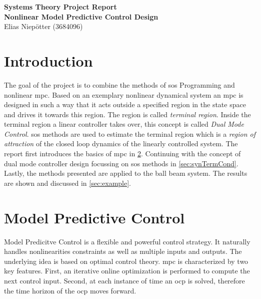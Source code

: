 \documentclass[10pt,a4paper]{article}
\begin{document}
\pagestyle{fancy}

\setlength{\parindent}{0pt}


\begin{center}
	\LARGE{\textbf{Systems Theory Project Report}}\\[0.25em]
	\normalsize\textbf{Nonlinear Model Predictive Control Design}\\[0.25em]
	\normalsize{Elias Niepötter (3684096)}
\end{center}

\vskip 0.5cm

\begin{abstract}
\end{abstract}

\vskip 0.5cm


\section{Introduction}
The goal of the project is to combine the methods of \gls{sos} Programming and nonlinear \gls{mpc}.
Based on an exemplary nonlinear dynamical system an \gls{mpc} is designed in such a way that it acts outside a specified
region in the state space and drives it towards this region. The region is called \textit{terminal region}. Inside the
terminal region a linear controller takes over, this concept is called \textit{Dual Mode Control}. \gls{sos} methods are 
used to estimate the terminal region which is a \textit{region of attraction} of the closed loop dynamics of the linearly 
controlled system.
The report first introduces the basics of \gls{mpc} in \ref{sec:mpc}. Continuing with the concept of dual mode controller 
design focussing on \gls{sos} methods in \ref{sec:synTermCond}. Lastly, the methods presented are applied to the 
ball beam system. The results are shown and discussed in \ref{sec:example}. 

\section{Model Predictive Control}
\label{sec:mpc}
Model Predicitve Control is a flexible and powerful control strategy. It naturally handles nonlinearities constraints as
well as multiple inputs and outputs. The underlying idea is based on optimal control theory. \gls{mpc} is characterized by
two key features. First, an iterative online optimization is performed to compute the next control input. Second, at each 
instance of time an \gls{ocp} is solved, therefore the time horizon of the \gls{ocp} moves forward. \cite{nmpcBible}
\end{document}
